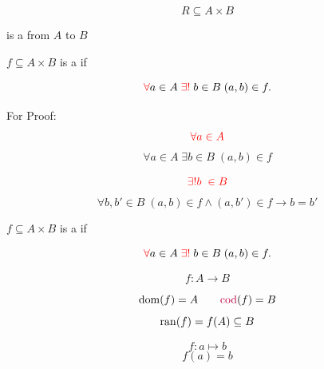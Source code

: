 
\begin{frame}{}
  \begin{center}
  \end{center}
\end{frame}

\begin{frame}{}
  \[
    R \subseteq A \times B
  \]

  \begin{center}
    is a  from $A$ to $B$
  \end{center}
\end{frame}

\begin{frame}{}
  \begin{definition}[Function]
    $f \subseteq A \times B$ is a   if

    \[
      \textcolor{red}{\forall} a \in A\; \textcolor{red}{\exists!} \;b \in B\; (a, b) \in f.
    \]
  \end{definition}

  \vspace{0.30cm}
  \begin{alertblock}{For Proof:}
    \pause
    \[
      \textcolor{red}{\forall a \in A}
    \]
    \[
      \forall a \in A\; \exists b \in B\; (a, b) \in f
    \]

    \pause
    \[
      \textcolor{red}{\exists! b \;\in B}
    \]
    \[
      \forall b, b' \in B\; (a, b) \in f \land (a, b') \in f \to b = b'
    \]
  \end{alertblock}
\end{frame}

\begin{frame}{}
  \begin{definition}[Function]
    $f \subseteq A \times B$ is a   if

    \[
      \textcolor{red}{\forall} a \in A\; \textcolor{red}{\exists!} \;b \in B\; (a, b) \in f.
    \]
  \end{definition}

  \pause
  \[
    f: A \to B
  \]

  \pause
  \[
    \text{\textup{dom}}(f) = A \qquad \textcolor{purple}{\text{\textup{cod}}}(f) = B
  \]
  \[
    \text{\textup{ran}}(f) = f(A) \subseteq B
  \]

  \pause
  \[
    f: a \mapsto b
  \]
  \[
    f(a) = b
  \]
\end{frame}

